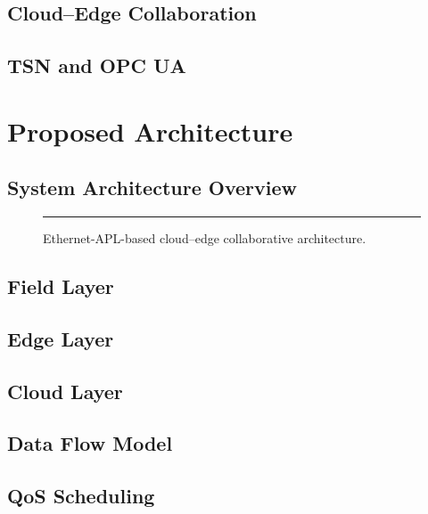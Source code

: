 \documentclass[conference]{IEEEtran}
\begin{document}
\subsection{Cloud--Edge Collaboration}

\subsection{TSN and OPC UA}

\section{Proposed Architecture}\label{sec:method}

\subsection{System Architecture Overview}

\begin{figure}[!t]
  \centering
  \rule{\columnwidth}{0.4pt}
  \caption{Ethernet-APL-based cloud--edge collaborative architecture.}
  \label{fig:architecture}
\end{figure}

\subsection{Field Layer}

\subsection{Edge Layer}

\subsection{Cloud Layer}

\subsection{Data Flow Model}

\subsection{QoS Scheduling}
\end{document}
